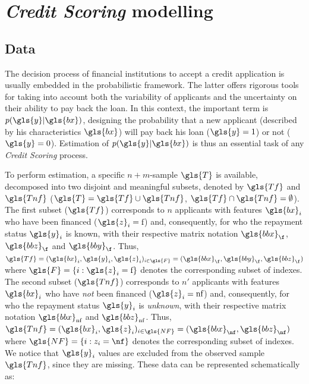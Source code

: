 \section{\textit{Credit Scoring} modelling} \label{sec:criteres}

\subsection{Data} 

The decision process of financial institutions to accept a credit application is usually embedded in the  probabilistic framework. The latter offers rigorous tools for taking into account both the variability of applicants and the uncertainty on their ability to pay back the loan. In this context, the important term is $p(\gls{y}|\gls{bx})$, designing the probability that a new applicant (described by his characteristics $\gls{bx}$) will pay back his loan ($\gls{y}=1$) or not ($\gls{y}=0$). Estimation of $p(\gls{y}|\gls{bx})$ is thus an essential task of any \textit{Credit Scoring} process.

To perform estimation, a specific $n + m$-sample $\gls{T}$ is available, decomposed into two disjoint and meaningful subsets, denoted by $\gls{Tf}$ and $\gls{Tnf}$ ($\gls{T}=\gls{Tf} \cup \gls{Tnf}$, $\gls{Tf} \cap \gls{Tnf}=\emptyset$). The first subset ($\gls{Tf}$) corresponds to $n$ applicants with features $\gls{bx}_i$ who have been financed ($\gls{z}_i={\text{f}}$) and, consequently, for who the repayment status $\gls{y}_i$ is known, with their respective matrix notation $\gls{bbx}_\f$, $\gls{bbz}_\f$ and $\gls{bby}_\f$. Thus, $\gls{Tf}=(\gls{bx}_i,\gls{y}_i,\gls{z}_i)_{i\in \gls{F}} = (\gls{bbx}_\f,\gls{bby}_\f,\gls{bbz}_\f)$ where $\gls{F}=\{i:\gls{z}_i={\text{f}}\}$ denotes the corresponding subset of indexes. The second subset ($\gls{Tnf}$) corresponds to $n'$ applicants with features $\gls{bx}_i$ who have {\it not} been financed ($\gls{z}_i={\text{nf}}$) and, consequently, for who the repayment status $\gls{y}_i$ is {\it unknown}, with their respective matrix notation $\gls{bbx}_{\text{nf}}$ and $\gls{bbz}_{\text{nf}}$. Thus, $\gls{Tnf}=(\gls{bx}_i,\gls{z}_i)_{i\in \gls{NF}} = (\gls{bbx}_{\nf}, \gls{bbz}_{\nf})$ where $\gls{NF}=\{i:z_i={\nf}\}$ denotes the corresponding subset of indexes. We notice that $\gls{y}_i$ values are excluded from the observed sample $\gls{Tnf}$, since they are missing. These data can be represented schematically as:

